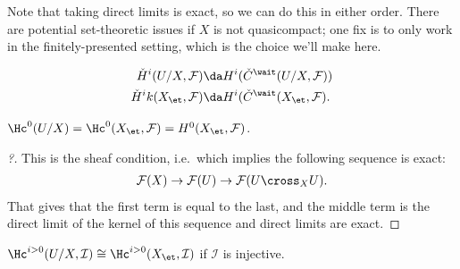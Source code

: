 \begin{remark}

Note that taking direct limits is exact, so we can do this in either
order. There are potential set-theoretic issues if \(X\) is not
quasicompact; one fix is to only work in the finitely-presented setting,
which is the choice we'll make here.

\end{remark}

\begin{definition}\label{def:cech_cohomology}

\begin{align*}  
\check{H}^i(U/X, \mathcal{F}) &\da H^i(\check{C}^\wait (U/X, \mathcal{F})) \\
\check{H}^ik(X_\et, \mathcal{F}) &\da H^i(\check{C}^\wait (X_\et, \mathcal{F})
.\end{align*}

\end{definition}

\begin{proposition}[?]

\(\Hc^0(U/X) = \Hc^0(X_\et, \mathcal{F}) = H^0(X_\et, \mathcal{F})\).

\end{proposition}

\begin{proof}[?]

This is the sheaf condition, i.e.~which implies the following sequence
is exact:
\begin{align*}  
\mathcal{F}(X) \to \mathcal{F}(U) \to \mathcal{F}(U\cross_X U)
.\end{align*} That gives that the first term is equal to the last, and
the middle term is the direct limit of the kernel of this sequence and
direct limits are exact.

\end{proof}

\begin{proposition}[?]

\(\Hc^{i> 0} (U/X, \mathcal{I}) \cong \Hc^{i> 0}(X_\et, \mathcal{I})\)
if \(\mathcal{I}\) is injective.

\end{proposition}

